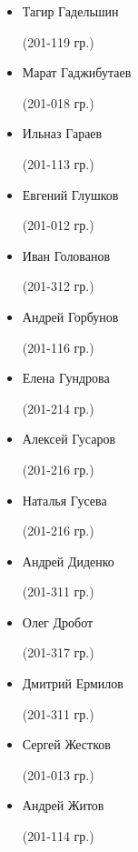 \begin{multicols}{2}
\begin{small}
\begin{itemize}[leftmargin=0.5em]
	\item[] Тагир Гадельшин\begin{tiny} (201-119 гр.)\end{tiny}
	\item[] Марат Гаджибутаев\begin{tiny} (201-018 гр.)\end{tiny}
	\item[] Ильназ Гараев\begin{tiny} (201-113 гр.)\end{tiny}
	\item[] Евгений Глушков\begin{tiny} (201-012 гр.)\end{tiny}
	\item[] Иван Голованов\begin{tiny} (201-312 гр.)\end{tiny} %
	\item[] Андрей Горбунов\begin{tiny} (201-116 гр.)\end{tiny} %
	\item[] Елена Гундрова\begin{tiny} (201-214 гр.)\end{tiny}
	\item[] Алексей Гусаров\begin{tiny} (201-216 гр.)\end{tiny}
	\item[] Наталья Гусева\begin{tiny} (201-216 гр.)\end{tiny} %

	\item[] Андрей Диденко\begin{tiny} (201-311 гр.)\end{tiny} %
	\item[] Олег Дробот\begin{tiny} (201-317 гр.)\end{tiny} %

	\item[] Дмитрий Ермилов\begin{tiny} (201-311 гр.)\end{tiny} %

	\item[] Сергей Жестков\begin{tiny} (201-013 гр.)\end{tiny}
	\item[] Андрей Житов\begin{tiny} (201-114 гр.)\end{tiny} %


\end{itemize}
\end{small}
\end{multicols}
